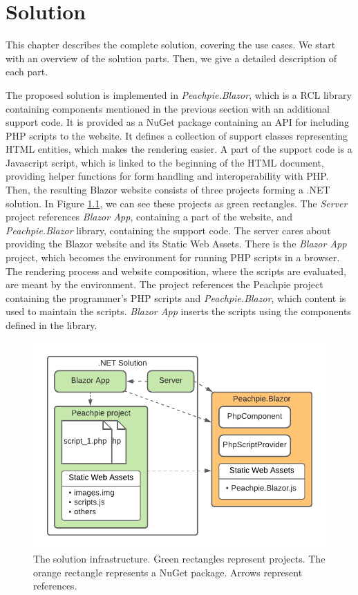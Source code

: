 \chapter{Solution}

This chapter describes the complete solution, covering the use cases.
We start with an overview of the solution parts.
Then, we give a detailed description of each part.
\par
The proposed solution is implemented in \textit{Peachpie.Blazor}, which is a RCL library containing components mentioned in the previous section with an additional support code.
It is provided as a NuGet package containing an API for including PHP scripts to the website.
It defines a collection of support classes representing HTML entities, which makes the rendering easier.
A part of the support code is a Javascript script, which is linked to the beginning of the HTML document, providing helper functions for form handling and interoperability with PHP.
Then, the resulting Blazor website consists of three projects forming a .NET solution.
In Figure \ref{img13:infrastructure}, we can see these projects as green rectangles.
The \textit{Server} project references \textit{Blazor App}, containing a part of the website, and \textit{Peachpie.Blazor} library, containing the support code.
The server cares about providing the Blazor website and its Static Web Assets.
There is the \textit{Blazor App} project, which becomes the environment for running PHP scripts in a browser.
The rendering process and website composition, where the scripts are evaluated, are meant by the environment.
The project references the Peachpie project containing the programmer's PHP scripts and \textit{Peachpie.Blazor}, which content is used to maintain the scripts.
\textit{Blazor App} inserts the scripts using the components defined in the library.
\par
\begin{figure}[!b]\centering
\includegraphics[scale=0.9]{./img/SolutionInfrastructure}
\caption{The solution infrastructure. Green rectangles represent projects. The orange rectangle represents a NuGet package. Arrows represent references.}
\label{img13:infrastructure}
\end{figure} 
